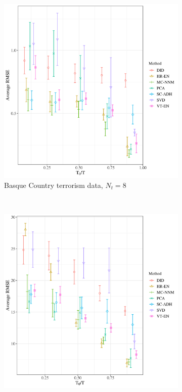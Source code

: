 \documentclass[12pt]{article}
\begin{document}
\begin{figure}[htbp]
	\centering
	\begin{subfigure}[t]{0.48\textwidth}
		\centering
		\includegraphics[width=\textwidth]{plots/basque_N_16_T_43_numruns_20_num_treated_8_simultaneuous_0.png}
		\caption{Basque Country terrorism data, $N_t = 8$} 
	\end{subfigure}
	~ 
	\begin{subfigure}[t]{0.48\textwidth}
		\centering
		\includegraphics[width=\textwidth]{plots/california_N_38_T_31_numruns_20_num_treated_19_simultaneuous_0.png}

\end{subfigure}
\end{figure}
\end{document}
